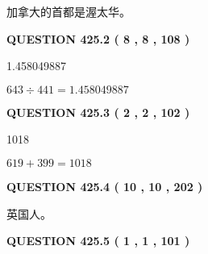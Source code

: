 \documentclass{ctexart}
\begin{document}
  
 
 
\noindent{}
 
 
加拿大的首都是渥太华。
 
 
 
 
  
\vspace{0.2in}
  
{\textbf{\Large{QUESTION
425.2 
 ( 8 , 8 , 108 )
}}}
  
  
 
 
\noindent{}

1.458049887
 
 
 
 
\noindent{}

$ %
643 \div  %
441=   %
1.458049887$
 
 
  
\vspace{0.2in}
  
{\textbf{\Large{QUESTION
425.3 
 ( 2 , 2 , 102 )
}}}
  
  
 
 
\noindent{}

1018
 
 
 
 
\noindent{}

$ %
619 +  %
399=   %
1018$
 
 
  
\vspace{0.2in}
  
{\textbf{\Large{QUESTION
425.4 
 ( 10 , 10 , 202 )
}}}
  
  
 
 
\noindent{}
 
 
英国人。
 
 
 
 
  
\vspace{0.2in}
  
{\textbf{\Large{QUESTION
425.5 
 ( 1 , 1 , 101 )
}}}
  
  
 
\end{document}

